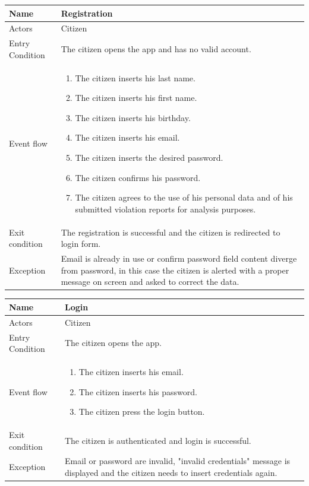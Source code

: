 \begin{tabular}{|p{3.1cm}|p{11.6cm}|}
\hline
Name & Registration\\
\hline
Actors & Citizen\\
\hline
Entry Condition & The citizen opens the app and has no valid account.\\
\hline
Event flow & \begin{enumerate}
				\item The citizen inserts his last name.
				\item The citizen inserts his first name.
				\item The citizen inserts his birthday.
                \item The citizen inserts his email.
                \item The citizen inserts the desired password.
                \item The citizen confirms his password.
                \item The citizen agrees to the use of his personal data and of his submitted violation reports for analysis purposes.
            \end{enumerate}\\
\hline
Exit condition & The registration is successful and the citizen is redirected to login form.\\
\hline
Exception & Email is already in use or confirm password field content diverge from password, in this case the citizen is alerted with a proper message on screen and asked to correct the data.\\
\hline
\end{tabular}

\vskip 0.2in
\begin{tabular}{|p{3.1cm}|p{11.6cm}|}
\hline
Name & Login\\
\hline
Actors & Citizen\\
\hline
Entry Condition & The citizen opens the app.\\
\hline
Event flow & \begin{enumerate}
                \item The citizen inserts his email.
                \item The citizen inserts his password.
                \item The citizen press the login button.
            \end{enumerate}\\
\hline
Exit condition & The citizen is authenticated and login is successful.\\
\hline
Exception & Email or password are invalid, "invalid credentials" message is displayed and the citizen needs to insert credentials again.\\
\hline
\end{tabular}

